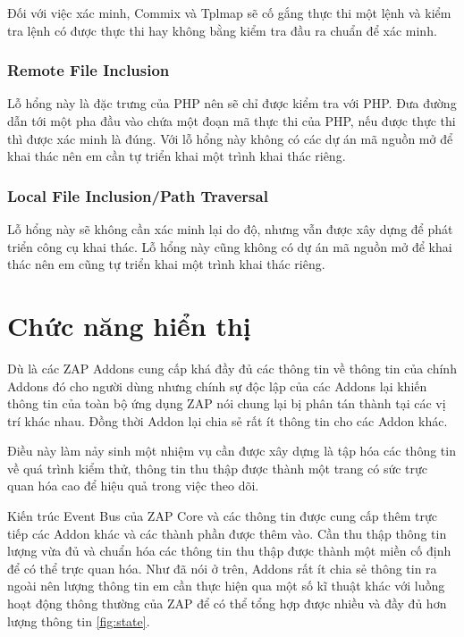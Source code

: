 \documentclass[./../main.tex]{subfiles}
\begin{document}
Đối với việc xác minh, Commix và Tplmap sẽ cố gắng thực thi một lệnh
và kiểm tra lệnh có được thực thi hay không bằng kiểm tra đầu ra chuẩn
để xác minh.

\subsubsection{Remote File Inclusion}
Lỗ hổng này là đặc trưng của PHP nên sẽ chỉ được kiểm tra với PHP. Đưa
đường dẫn tới một pha đầu vào chứa một đoạn mã thực thi của PHP, nếu
được thực thi thì được xác minh là đúng. Với lỗ hổng này không có các
dự án mã nguồn mở để khai thác nên em cần tự triển khai một trình khai
thác riêng.
\subsubsection{Local File Inclusion/Path Traversal}
Lỗ hổng này sẽ không cần xác minh lại do độ, nhưng vẫn được xây dựng để
phát triển công cụ khai thác. Lỗ hổng này cũng không có dự án mã nguồn
mở để khai thác nên em cũng tự triển khai một trình khai thác riêng.

\section{Chức năng hiển thị}
Dù là các ZAP Addons cung cấp khá đầy đủ các thông tin về thông tin của
chính Addons đó cho người dùng nhưng chính sự độc lập của các Addons lại
khiến thông tin của toàn bộ ứng dụng ZAP nói chung lại bị phân tán thành
tại các vị trí khác nhau. Đồng thời Addon lại chia sẻ rất ít thông
tin cho các Addon khác.

Điều này làm nảy sinh một nhiệm vụ cần được xây dựng là tập hóa các thông
tin về quá trình kiểm thử, thông tin thu thập được thành một trang có sức
trực quan hóa cao để hiệu quả trong việc theo dõi.

Kiến trúc Event Bus của ZAP Core và các thông tin được cung cấp thêm trực
tiếp các Addon khác và các thành phần được thêm vào. Cần thu thập thông
tin lượng vừa đủ và chuẩn hóa các thông tin thu thập được thành một miền
cố định để có thể trực quan hóa. Như đã nói ở trên, Addons rất ít chia sẻ
thông tin ra ngoài nên lượng thông tin em cần thực hiện qua một số kĩ
thuật khác với luồng hoạt động thông thường của ZAP để có thể tổng hợp
được nhiều và đầy đủ hơn lượng thông tin \ref{fig:state}.
\end{document}
